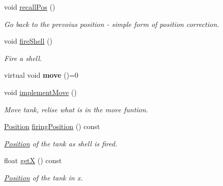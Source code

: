 \begin{DoxyCompactItemize}
\mbox{\label{class_tank_a656fff479053496146ac731b851e38ac}} 
void \mbox{\hyperlink{class_tank_a656fff479053496146ac731b851e38ac}{recall\+Pos}} ()
\begin{DoxyCompactList}\small\item\em Go back to the prevoius position -\/ simple form of position correction. \end{DoxyCompactList}\item 
\mbox{\label{class_tank_a381debea1a8951fa633051343565a76b}} 
void \mbox{\hyperlink{class_tank_a381debea1a8951fa633051343565a76b}{fire\+Shell}} ()
\begin{DoxyCompactList}\small\item\em Fire a shell. \end{DoxyCompactList}\item 
\mbox{\label{class_tank_ae7bb118a1220a1f0a3cce20017499bd8}} 
virtual void {\bfseries move} ()=0
\item 
\mbox{\label{class_tank_a251760fd6484b08389e70712387e42b1}} 
void \mbox{\hyperlink{class_tank_a251760fd6484b08389e70712387e42b1}{implement\+Move}} ()
\begin{DoxyCompactList}\small\item\em Move tank, relise what is in the move funtion. \end{DoxyCompactList}\item 
\mbox{\label{class_tank_a5a801ccb0e922bf03b46da1d6e07c49f}} 
\mbox{\hyperlink{class_position}{Position}} \mbox{\hyperlink{class_tank_a5a801ccb0e922bf03b46da1d6e07c49f}{firing\+Position}} () const
\begin{DoxyCompactList}\small\item\em \mbox{\hyperlink{class_position}{Position}} of the tank as shell is fired. \end{DoxyCompactList}\item 
\mbox{\label{class_tank_aeab5ff8d3aff0512111c7efded049f89}} 
float \mbox{\hyperlink{class_tank_aeab5ff8d3aff0512111c7efded049f89}{getX}} () const
\begin{DoxyCompactList}\small\item\em \mbox{\hyperlink{class_position}{Position}} of the tank in x. \end{DoxyCompactList}\item 

\end{DoxyCompactItemize}
